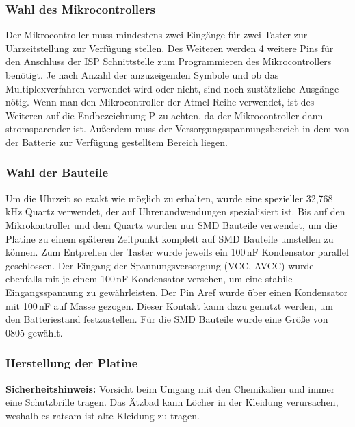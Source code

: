 \subsubsection{Wahl des Mikrocontrollers}
Der Mikrocontroller muss mindestens zwei Eingänge für zwei Taster zur Uhrzeitstellung zur Verfügung stellen. Des Weiteren werden 4 weitere Pins für den Anschluss der ISP Schnittstelle zum Programmieren des Mikrocontrollers benötigt. Je nach Anzahl der anzuzeigenden Symbole und ob das Multiplexverfahren verwendet wird oder nicht,  sind noch zustätzliche Ausgänge nötig. Wenn man den Mikrocontroller der Atmel-Reihe verwendet, ist des Weiteren auf die Endbezeichnung P zu achten, da der Mikrocontroller dann stromsparender ist. Außerdem muss der Versorgungsspannungsbereich in dem von der Batterie zur Verfügung gestelltem Bereich liegen.\\

\subsubsection{Wahl der Bauteile}
Um die Uhrzeit so exakt wie möglich zu erhalten, wurde eine spezieller 32,768\,kHz Quartz verwendet, der auf Uhrenandwendungen spezialisiert ist. Bis auf den Mikrokontroller und dem Quartz wurden nur SMD Bauteile verwendet, um die Platine zu einem späteren Zeitpunkt komplett auf SMD Bauteile umstellen zu können. Zum Entprellen der Taster wurde jeweils ein 100\,nF Kondensator parallel geschlossen. Der Eingang der Spannungsversorgung (VCC, AVCC) wurde ebenfalls mit je einem 100\,nF Kondensator versehen, um eine stabile Eingangsspannung zu gewährleisten. Der Pin Aref wurde über einen Kondensator mit 100\,nF auf Masse gezogen. Dieser Kontakt kann dazu genutzt werden, um den Batteriestand festzustellen. Für die SMD Bauteile wurde eine Größe von 0805 gewählt.\\

\subsubsection{Herstellung der Platine}
\textbf{Sicherheitshinweis:} Vorsicht beim Umgang mit den Chemikalien und immer eine Schutzbrille tragen. Das Ätzbad kann Löcher in der Kleidung verursachen, weshalb es ratsam ist alte Kleidung zu tragen.\\


